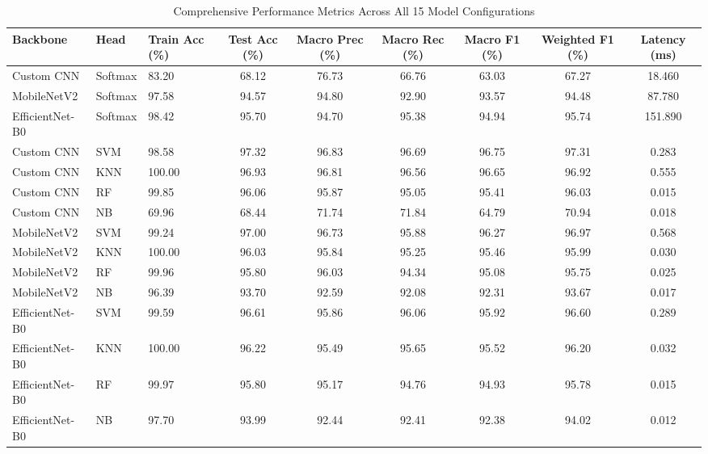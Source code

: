 \begin{table}[htbp]
\caption{Comprehensive Performance Metrics Across All 15 Model Configurations}
\label{tab:all_15_models}
\centering
\small
\begin{tabular}{lllcccccc}
\toprule
\textbf{Backbone} & \textbf{Head} & \textbf{Train Acc (\%)} & \textbf{Test Acc (\%)} & \textbf{Macro Prec (\%)} & \textbf{Macro Rec (\%)} & \textbf{Macro F1 (\%)} & \textbf{Weighted F1 (\%)} & \textbf{Latency (ms)} \\
\midrule
Custom CNN & Softmax & 83.20 & 68.12 & 76.73 & 66.76 & 63.03 & 67.27 & 18.460 \\
MobileNetV2 & Softmax & 97.58 & 94.57 & 94.80 & 92.90 & 93.57 & 94.48 & 87.780 \\
EfficientNet-B0 & Softmax & 98.42 & 95.70 & 94.70 & 95.38 & 94.94 & 95.74 & 151.890 \\
Custom CNN & SVM & 98.58 & 97.32 & 96.83 & 96.69 & 96.75 & 97.31 & 0.283 \\
Custom CNN & KNN & 100.00 & 96.93 & 96.81 & 96.56 & 96.65 & 96.92 & 0.555 \\
Custom CNN & RF & 99.85 & 96.06 & 95.87 & 95.05 & 95.41 & 96.03 & 0.015 \\
Custom CNN & NB & 69.96 & 68.44 & 71.74 & 71.84 & 64.79 & 70.94 & 0.018 \\
MobileNetV2 & SVM & 99.24 & 97.00 & 96.73 & 95.88 & 96.27 & 96.97 & 0.568 \\
MobileNetV2 & KNN & 100.00 & 96.03 & 95.84 & 95.25 & 95.46 & 95.99 & 0.030 \\
MobileNetV2 & RF & 99.96 & 95.80 & 96.03 & 94.34 & 95.08 & 95.75 & 0.025 \\
MobileNetV2 & NB & 96.39 & 93.70 & 92.59 & 92.08 & 92.31 & 93.67 & 0.017 \\
EfficientNet-B0 & SVM & 99.59 & 96.61 & 95.86 & 96.06 & 95.92 & 96.60 & 0.289 \\
EfficientNet-B0 & KNN & 100.00 & 96.22 & 95.49 & 95.65 & 95.52 & 96.20 & 0.032 \\
EfficientNet-B0 & RF & 99.97 & 95.80 & 95.17 & 94.76 & 94.93 & 95.78 & 0.015 \\
EfficientNet-B0 & NB & 97.70 & 93.99 & 92.44 & 92.41 & 92.38 & 94.02 & 0.012 \\
\bottomrule
\end{tabular}
\end{table}
